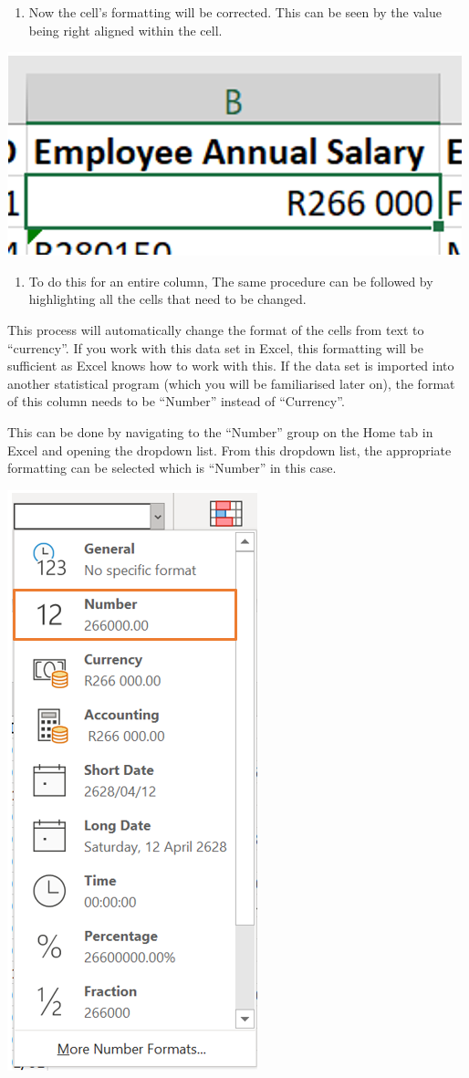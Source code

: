 \documentclass[
]{book}
\providecommand{\tightlist}{%
  \setlength{\itemsep}{0pt}\setlength{\parskip}{0pt}}
\begin{document}
\begin{enumerate}
\def\labelenumi{\arabic{enumi}.}
\setcounter{enumi}{2}
\tightlist
\item
  Now the cell's formatting will be corrected. This can be seen by the value being right aligned within the cell.
\end{enumerate}

\begin{center}\includegraphics[width=0.4\linewidth]{Figures/cleaning_formatting_3} \end{center}

\begin{enumerate}
\def\labelenumi{\arabic{enumi}.}
\setcounter{enumi}{3}
\tightlist
\item
  To do this for an entire column, The same procedure can be followed by highlighting all the cells that need to be changed.
\end{enumerate}

This process will automatically change the format of the cells from text to ``currency''. If you work with this data set in Excel, this formatting will be sufficient as Excel knows how to work with this. If the data set is imported into another statistical program (which you will be familiarised later on), the format of this column needs to be ``Number'' instead of ``Currency''.

This can be done by navigating to the ``Number'' group on the Home tab in Excel and opening the dropdown list. From this dropdown list, the appropriate formatting can be selected which is ``Number'' in this case.

\begin{center}\includegraphics[width=0.4\linewidth]{Figures/cleaning_formatting_4} \end{center}
\end{document}

